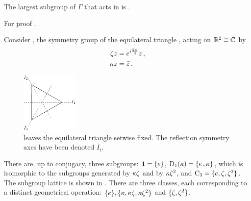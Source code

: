 \begin{lemma}
  The largest subgroup of $\Gamma$ that acts in \Fix{\Sigma} is \Nlz{\Sigma}.
  \label{lem:NlzActs}
\end{lemma}
For proof \cf {}.



\begin{example} %
Consider , the symmetry group of the equilateral triangle
, acting on $\mathbb{R}^{2}\cong\mathbb{C}^{}$ by
\begin{subequations}\label{eq:D3onR2}
\begin{align}	
  \zeta z &= e^{i\frac{2\pi}{3}} z\,,\\
  \kappa z  &= \bar{z}\,.
 \end{align}
\end{subequations}

\begin{figure}
\begin{center}
		\includegraphics[width=0.25\textwidth]{../figs/D3triangle}
\end{center}
\caption[ symmetry]{
    {\small
     leaves the equilateral triangle setwise fixed.
    The reflection symmetry axes have been denoted $I_i$.}}
\label{fig:D3triangle}
    \vspace*{-5pt}
\end{figure}

There are, up to conjugacy, three subgroups: $\mathbf{1}=\{e\}$, $\mathrm{D}_1(\kappa)=\{e\,,\kappa\}$,
which is isomorphic to the subgroups generated
by $\kappa\zeta$ and by $\kappa\zeta^2$, and $\mathrm{C}_{3}=\{e,\zeta,\zeta^2\}$.
The subgroup lattice is shown in .
There are three classes, each corresponding to
a distinct geometrical operation: $\{e\},\{\kappa,\kappa\zeta,\kappa\zeta^2\}$
and $\{\zeta,\zeta^2\}$.


\end{example}


